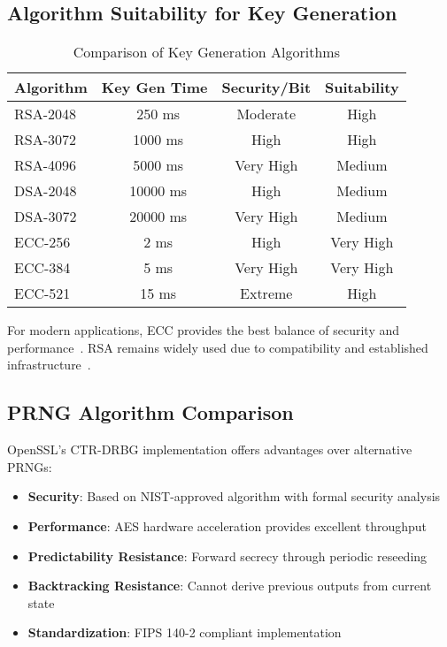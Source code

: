 \subsection{Algorithm Suitability for Key Generation}

\begin{table}[ht]
    \centering
    \caption{Comparison of Key Generation Algorithms}
    \begin{tabular}{|l|c|c|c|}
        \hline
        \textbf{Algorithm} & \textbf{Key Gen Time} & \textbf{Security/Bit} & \textbf{Suitability} \\
        \hline
        RSA-2048           & ~250 ms               & Moderate              & High                 \\
        RSA-3072           & ~1000 ms              & High                  & High                 \\
        RSA-4096           & ~5000 ms              & Very High             & Medium               \\
        \hline
        DSA-2048           & ~10000 ms             & High                  & Medium               \\
        DSA-3072           & ~20000 ms             & Very High             & Medium               \\
        \hline
        ECC-256            & ~2 ms                 & High                  & Very High            \\
        ECC-384            & ~5 ms                 & Very High             & Very High            \\
        ECC-521            & ~15 ms                & Extreme               & High                 \\
        \hline
    \end{tabular}
\end{table}

For modern applications, ECC provides the best balance of security and performance~\cite{hankerson2006guide}. RSA remains widely used due to compatibility and established infrastructure~\cite{schneier2015applied}.

\subsection{PRNG Algorithm Comparison}

OpenSSL's CTR-DRBG implementation offers advantages over alternative PRNGs:
\begin{itemize}
    \item \textbf{Security}: Based on NIST-approved algorithm with formal security analysis
    \item \textbf{Performance}: AES hardware acceleration provides excellent throughput
    \item \textbf{Predictability Resistance}: Forward secrecy through periodic reseeding
    \item \textbf{Backtracking Resistance}: Cannot derive previous outputs from current state
    \item \textbf{Standardization}: FIPS 140-2 compliant implementation
\end{itemize}

